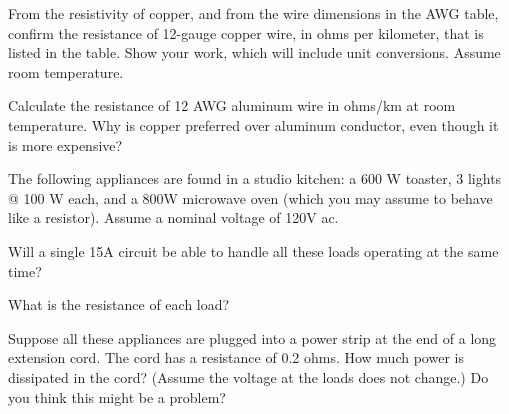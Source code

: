 \documentclass{article}
\begin{document}
\subproblem
From the resistivity of copper, and from the wire dimensions in the AWG
table, confirm the resistance of 12-gauge copper wire, in ohms per kilometer,
that is listed in the table.  Show your work, which will include unit
conversions.  Assume room temperature.


\subproblem
Calculate the resistance of 12 AWG aluminum wire in ohms/km at room
temperature. Why is copper preferred over aluminum conductor, even though it is
more expensive?



The following appliances are found in a studio kitchen: a 600 W toaster, 3
lights @ 100 W each, and a 800W microwave oven (which you may assume to behave
like a resistor). Assume a nominal voltage of 120V ac.

\subproblem
Will a single 15A circuit be able to handle all these loads operating at the
same time?


\subproblem
What is the resistance of each load?


\subproblem
Suppose all these appliances are plugged into a power strip at the end of a
long extension cord. The cord has a resistance of 0.2 ohms. How much power is
dissipated in the cord?  (Assume the voltage at the loads does not
change.)  Do you think this might be a problem?

\end{document}
